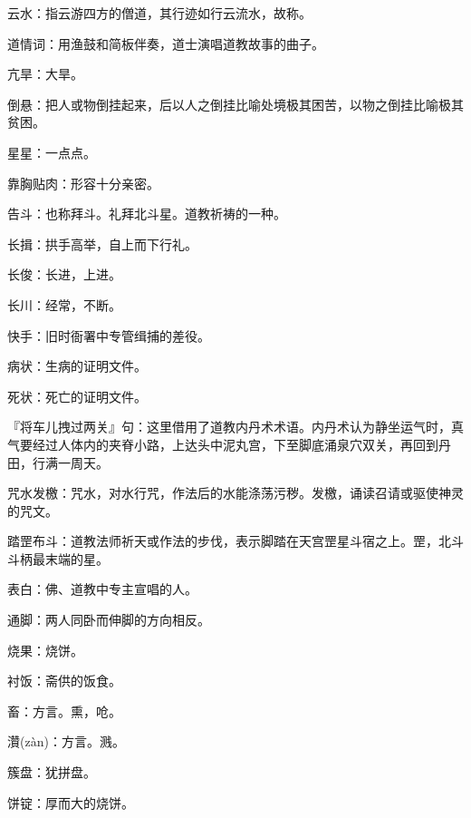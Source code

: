 \startbuffer[1436]
云水：指云游四方的僧道，其行迹如行云流水，故称。
\stopbuffer


\startbuffer[1437]
道情词：用渔鼓和简板伴奏，道士演唱道教故事的曲子。
\stopbuffer


\startbuffer[1438]
亢旱：大旱。
\stopbuffer


\startbuffer[1439]
倒悬：把人或物倒挂起来，后以人之倒挂比喻处境极其困苦，以物之倒挂比喻极其贫困。
\stopbuffer


\startbuffer[1440]
星星：一点点。
\stopbuffer


\startbuffer[1441]
靠胸贴肉：形容十分亲密。
\stopbuffer


\startbuffer[1442]
告斗：也称拜斗。礼拜北斗星。道教祈祷的一种。
\stopbuffer


\startbuffer[1443]
长揖：拱手高举，自上而下行礼。
\stopbuffer


\startbuffer[1444]
长俊：长进，上进。
\stopbuffer


\startbuffer[1445]
长川：经常，不断。
\stopbuffer


\startbuffer[1446]
快手：旧时衙署中专管缉捕的差役。
\stopbuffer


\startbuffer[1447]
病状：生病的证明文件。
\stopbuffer


\startbuffer[1448]
死状：死亡的证明文件。
\stopbuffer


\startbuffer[1449]
『将车儿拽过两关』句：这里借用了道教内丹术术语。内丹术认为静坐运气时，真气要经过人体内的夹脊小路，上达头中泥丸宫，下至脚底涌泉穴双关，再回到丹田，行满一周天。
\stopbuffer


\startbuffer[1450]
咒水发檄：咒水，对水行咒，作法后的水能涤荡污秽。发檄，诵读召请或驱使神灵的咒文。
\stopbuffer


\startbuffer[1451]
踏罡布斗：道教法师祈天或作法的步伐，表示脚踏在天宫罡星斗宿之上。罡，北斗斗柄最末端的星。
\stopbuffer


\startbuffer[1452]
表白：佛、道教中专主宣唱的人。
\stopbuffer


\startbuffer[1453]
通脚：两人同卧而伸脚的方向相反。
\stopbuffer


\startbuffer[1454]
烧果：烧饼。
\stopbuffer


\startbuffer[1455]
衬饭：斋供的饭食。
\stopbuffer


\startbuffer[1456]
畜：方言。熏，呛。
\stopbuffer


\startbuffer[1457]
灒(zàn)：方言。溅。
\stopbuffer


\startbuffer[1458]
簇盘：犹拼盘。
\stopbuffer


\startbuffer[1459]
饼锭：厚而大的烧饼。
\stopbuffer


